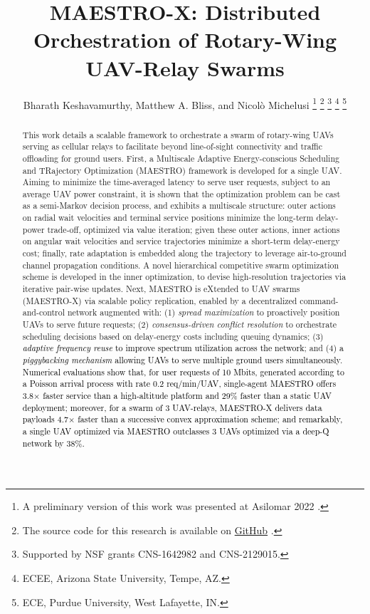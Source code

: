 \documentclass[10pt, twocolumn]{IEEEtran}
\title{MAESTRO-X: Distributed Orchestration of Rotary-Wing UAV-Relay Swarms}
\author{Bharath Keshavamurthy\IEEEauthorrefmark{1}, Matthew A. Bliss\IEEEauthorrefmark{2}, and Nicol\`{o} Michelusi\IEEEauthorrefmark{1}
\thanks{A preliminary version of this work was presented at Asilomar 2022 \cite{ASILOMAR}.}
\thanks{The source code for this research is available on \href{https://github.com/bharathkeshavamurthy/MAESTRO-X.git}{GitHub} \cite{MAESTRO-X}.}
\thanks{Supported by NSF grants CNS-1642982 and CNS-2129015.}
\thanks{\IEEEauthorrefmark{1}ECEE, Arizona State University, Tempe, AZ.}
\thanks{\IEEEauthorrefmark{2}ECE, Purdue University, West Lafayette, IN.}
\vspace{-6mm}
}
\theoremstyle{plain}
\theoremstyle{definition}
\theoremstyle{remark}
\newcommand\hlt[1]{\textcolor{black}{#1}}
\begin{document}
\balance
{}

\maketitle
\thispagestyle{plain}
\pagestyle{plain}
\vspace{-8mm}
\begin{abstract}
This work details a scalable framework to orchestrate a swarm of rotary-wing UAVs serving as cellular relays to facilitate beyond line-of-sight connectivity and traffic offloading for ground users. First, a Multiscale Adaptive Energy-conscious Scheduling and TRajectory Optimization (MAESTRO) framework is developed for a single UAV. Aiming to minimize the time-averaged latency to serve user requests, subject to an average UAV power constraint, it is shown that the optimization problem can be cast as a semi-Markov decision process, and exhibits a multiscale structure: outer actions on radial wait velocities and terminal service positions minimize the long-term delay-power trade-off, optimized via value iteration; given these outer actions, inner actions on angular wait velocities and service trajectories minimize a short-term delay-energy cost; finally, rate adaptation is embedded along the trajectory to leverage air-to-ground channel propagation conditions. A novel hierarchical competitive swarm optimization scheme is developed in the inner optimization, to devise high-resolution trajectories via iterative pair-wise updates. Next, MAESTRO is eXtended to UAV swarms (MAESTRO-X) via scalable policy replication, enabled by a decentralized command-and-control network augmented with: 
(1) \emph{spread maximization} to proactively position UAVs to serve future requests;
(2) \emph{consensus-driven conflict resolution} to orchestrate scheduling decisions based on delay-energy costs including queuing dynamics;
(3) \hlt{\emph{adaptive frequency reuse} to improve spectrum utilization across the network}; and 
(4) \hlt{a \emph{piggybacking mechanism} allowing UAVs to serve multiple ground users simultaneously}. 
\hlt{Numerical evaluations show that, for user requests of 10 Mbits, generated according to a Poisson arrival process with rate 0.2 req/min/UAV, single-agent MAESTRO offers 3.8$\times$ faster service than a high-altitude platform and 29\% faster than a static UAV deployment; moreover, for a swarm of 3 UAV-relays, MAESTRO-X delivers data payloads 4.7$\times$ faster than a successive convex approximation scheme; and remarkably, a single UAV optimized via MAESTRO outclasses 3 UAVs optimized via a deep-Q network by $38$\%.}
\end{abstract}
\end{document}

